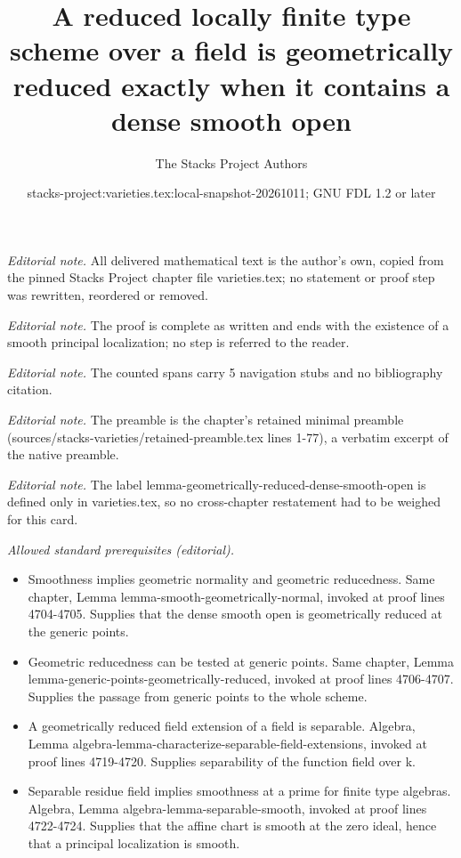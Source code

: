 \documentclass[10pt,a4paper]{amsart}
\title{A reduced locally finite type scheme over a field is geometrically reduced exactly when it contains a dense smooth open}
\author{The Stacks Project Authors}
\date{stacks-project:varieties.tex:local-snapshot-20261011; GNU FDL 1.2 or later}
\theoremstyle{plain}
\theoremstyle{definition}
\theoremstyle{remark}
\numberwithin{equation}{subsection}
\begin{document}
\maketitle
\noindent\textit{Editorial note.} All delivered mathematical text is the author's own, copied from the pinned Stacks Project chapter file varieties.tex; no statement or proof step was rewritten, reordered or removed.\par\medskip
\noindent\textit{Editorial note.} The proof is complete as written and ends with the existence of a smooth principal localization; no step is referred to the reader.\par\medskip
\noindent\textit{Editorial note.} The counted spans carry 5 navigation stubs and no bibliography citation.\par\medskip
\noindent\textit{Editorial note.} The preamble is the chapter's retained minimal preamble (sources/stacks-varieties/retained-preamble.tex lines 1-77), a verbatim excerpt of the native preamble.\par\medskip
\noindent\textit{Editorial note.} The label lemma-geometrically-reduced-dense-smooth-open is defined only in varieties.tex, so no cross-chapter restatement had to be weighed for this card.\par\medskip
\noindent\textit{Allowed standard prerequisites (editorial).}\begin{itemize}
\item Smoothness implies geometric normality and geometric reducedness. Same chapter, Lemma lemma-smooth-geometrically-normal, invoked at proof lines 4704-4705. Supplies that the dense smooth open is geometrically reduced at the generic points.
\item Geometric reducedness can be tested at generic points. Same chapter, Lemma lemma-generic-points-geometrically-reduced, invoked at proof lines 4706-4707. Supplies the passage from generic points to the whole scheme.
\item A geometrically reduced field extension of a field is separable. Algebra, Lemma algebra-lemma-characterize-separable-field-extensions, invoked at proof lines 4719-4720. Supplies separability of the function field over k.
\item Separable residue field implies smoothness at a prime for finite type algebras. Algebra, Lemma algebra-lemma-separable-smooth, invoked at proof lines 4722-4724. Supplies that the affine chart is smooth at the zero ideal, hence that a principal localization is smooth.
\end{itemize}\medskip
\end{document}
